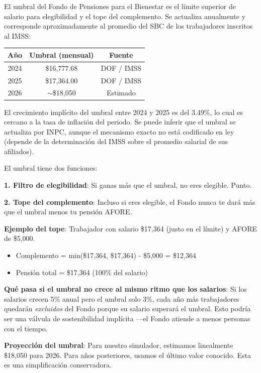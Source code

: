 \documentclass[11pt,a4paper]{report}
\begin{document}
\begin{tcolorbox}[colback=blue!5!white, colframe=blue!75!black, title=\textbf{Definici\'on Formal}]
El umbral del Fondo de Pensiones para el Bienestar es el l\'imite superior de salario para elegibilidad y el tope del complemento. Se actualiza anualmente y corresponde aproximadamente al promedio del SBC de los trabajadores inscritos al IMSS:

\begin{center}
\begin{tabular}{ccc}
\toprule
\textbf{A\~no} & \textbf{Umbral (mensual)} & \textbf{Fuente} \\
\midrule
2024 & \$16,777.68 & DOF / IMSS \\
2025 & \$17,364.00 & DOF / IMSS \\
2026 & $\sim$\$18,050 & Estimado \\
\bottomrule
\end{tabular}
\end{center}

El crecimiento impl\'icito del umbral entre 2024 y 2025 es del 3.49\%, lo cual es cercano a la tasa de inflaci\'on del periodo. Se puede inferir que el umbral se actualiza por INPC, aunque el mecanismo exacto no est\'a codificado en ley (depende de la determinaci\'on del IMSS sobre el promedio salarial de sus afiliados).
\end{tcolorbox}

\begin{tcolorbox}[colback=green!5!white, colframe=green!50!black, title=\textbf{Intuici\'on}]
El umbral tiene dos funciones:

\textbf{1. Filtro de elegibilidad}: Si ganas m\'as que el umbral, no eres elegible. Punto.

\textbf{2. Tope del complemento}: Incluso si eres elegible, el Fondo nunca te dar\'a m\'as que el umbral menos tu pensi\'on AFORE.

\textbf{Ejemplo del tope}: Trabajador con salario \$17,364 (justo en el l\'imite) y AFORE de \$5,000.
\begin{itemize}[nosep]
\item Complemento = min(\$17,364, \$17,364) - \$5,000 = \$12,364
\item Pensi\'on total = \$17,364 (100\% del salario)
\end{itemize}

\textbf{Qu\'e pasa si el umbral no crece al mismo ritmo que los salarios}: Si los salarios crecen 5\% anual pero el umbral solo 3\%, cada a\~no m\'as trabajadores quedar\'an \emph{excluidos} del Fondo porque su salario superar\'a el umbral. Esto podr\'ia ser una v\'alvula de sostenibilidad impl\'icita ---el Fondo atiende a menos personas con el tiempo.

\textbf{Proyecci\'on del umbral}: Para nuestro simulador, estimamos linealmente \$18,050 para 2026. Para a\~nos posteriores, usamos el \'ultimo valor conocido. Esta es una simplificaci\'on conservadora.
\end{tcolorbox}
\end{document}
